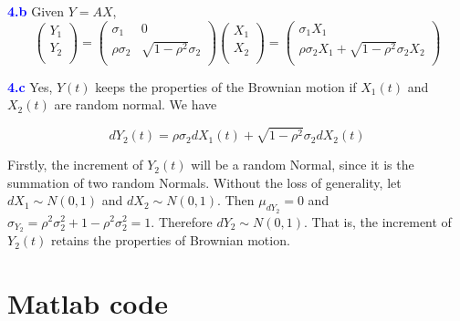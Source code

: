\documentclass[a4paper,11pt] {article}
\begin{document}
\textcolor{blue}{\bf 4.b } Given $Y = AX$,
$$
\left(
  \begin{array}{c}
    Y_1 \\
    Y_2 \\
  \end{array}
\right)
=
\left(
  \begin{array}{cc}
    \sigma_1 & 0 \\
    \rho \sigma_2 & \sqrt{1-\rho^2}\sigma_2 \\
  \end{array}
\right)
\left(
  \begin{array}{c}
    X_1 \\
    X_2 \\
  \end{array}
\right)
=
\left(
  \begin{array}{c}
    \sigma_1 X_1 \\
    \rho \sigma_2 X_1 + \sqrt{1-\rho^2} \sigma_2 X_2 \\
  \end{array}
\right)
$$

\textcolor{blue}{\bf 4.c } Yes, $Y(t)$ keeps the properties of the Brownian motion if $X_1(t)$ and $X_2(t)$ are random normal. We have

$$
dY_2(t) = \rho \sigma_2 dX_1(t) + \sqrt{1-\rho^2} \sigma_2 dX_2(t)
$$

Firstly, the increment of $Y_2(t)$ will be a random Normal, since it is the summation of two random Normals. Without the loss of generality, let $dX_1 \sim N(0,1)$ and $dX_2 \sim N(0,1)$. Then $\mu_{dY_2} = 0$ and $\sigma_{Y_2} = \rho^2\sigma_2^2 + 1 - \rho^2\sigma_2^2 = 1$. Therefore $dY_2 \sim N(0,1)$. That is, the increment of $Y_2(t)$ retains the properties of Brownian motion.

\section*{Matlab code}
\begin{spacing}{0.9}

\end{spacing}
\end{document}
